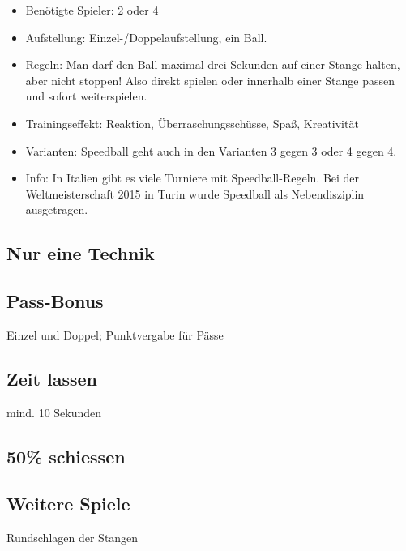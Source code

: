 \begin{itemize}
\item Benötigte Spieler: 2 oder 4 
\item Aufstellung: Einzel-/Doppelaufstellung, ein Ball.
\item Regeln: Man darf den Ball maximal drei Sekunden auf einer Stange halten, aber
nicht stoppen! Also direkt spielen oder innerhalb einer Stange passen und sofort
weiterspielen.
\item Trainingseffekt: Reaktion, Überraschungsschüsse, Spaß, Kreativität
\item Varianten: Speedball geht auch in den Varianten 3 gegen 3 oder 4 gegen 4.  
\item Info: In Italien gibt es viele Turniere mit Speedball-Regeln. Bei der Weltmeisterschaft 2015 in Turin wurde Speedball als Nebendisziplin ausgetragen. 
\end{itemize}

\subsection{Nur eine Technik}
\label{spielformen:sonderregeln:nureinetechnik}



\subsection{Pass-Bonus}
\label{spielformen:sonderregeln:passbonus}
Einzel und Doppel; Punktvergabe für Pässe

\subsection{Zeit lassen}
\label{spielformen:sonderregeln:zeitlassen}
mind. 10 Sekunden 

\subsection{50\% schiessen}
\label{spielformen:sonderregeln:zeitlassen}

\subsection{Weitere Spiele}
\label{spielformen:sonderregeln:weiteres}

Rundschlagen der Stangen

